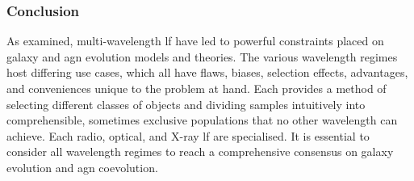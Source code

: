 \subsubsection{Conclusion}
As examined, multi-wavelength \gls{lf} have led to powerful constraints placed on galaxy and \gls{agn} evolution models and theories. The various wavelength regimes host differing use cases, which all have flaws, biases, selection effects, advantages, and conveniences unique to the problem at hand. Each provides a method of selecting different classes of objects and dividing samples intuitively into comprehensible, sometimes exclusive populations that no other wavelength can achieve. Each radio, optical, and X-ray \gls{lf} are specialised. It is essential to consider all wavelength regimes to reach a comprehensive consensus on galaxy evolution and \gls{agn} coevolution.